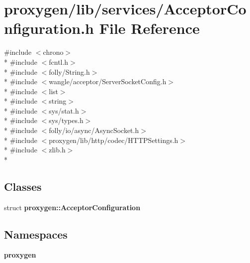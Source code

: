 \section{proxygen/lib/services/\+Acceptor\+Configuration.h File Reference}
\label{AcceptorConfiguration_8h}
{\ttfamily \#include $<$chrono$>$}\\*
{\ttfamily \#include $<$fcntl.\+h$>$}\\*
{\ttfamily \#include $<$folly/\+String.\+h$>$}\\*
{\ttfamily \#include $<$wangle/acceptor/\+Server\+Socket\+Config.\+h$>$}\\*
{\ttfamily \#include $<$list$>$}\\*
{\ttfamily \#include $<$string$>$}\\*
{\ttfamily \#include $<$sys/stat.\+h$>$}\\*
{\ttfamily \#include $<$sys/types.\+h$>$}\\*
{\ttfamily \#include $<$folly/io/async/\+Async\+Socket.\+h$>$}\\*
{\ttfamily \#include $<$proxygen/lib/http/codec/\+H\+T\+T\+P\+Settings.\+h$>$}\\*
{\ttfamily \#include $<$zlib.\+h$>$}\\*
\subsection*{Classes}
\begin{DoxyCompactItemize}
\item 
struct {\bf proxygen\+::\+Acceptor\+Configuration}
\end{DoxyCompactItemize}
\subsection*{Namespaces}
\begin{DoxyCompactItemize}
\item 
 {\bf proxygen}
\end{DoxyCompactItemize}
